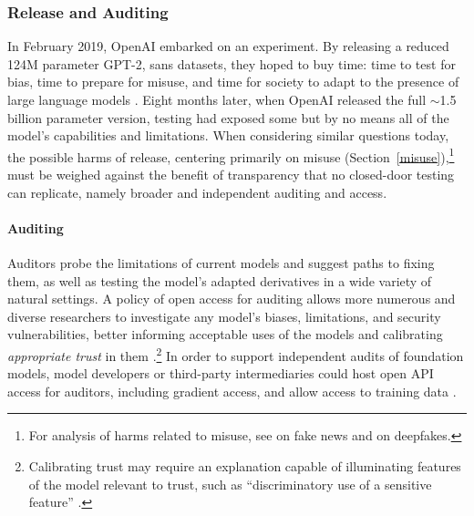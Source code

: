 \subsubsection{Release and Auditing}

In February 2019, OpenAI embarked on an experiment.  By releasing a reduced 124M parameter GPT-2, sans datasets, they hoped to buy time: time to test for bias, time to prepare for misuse, and time for society to adapt to the presence of large language models \citep{solaiman_release_2019}. Eight months later, when OpenAI released the full $\sim$1.5 billion parameter version, testing had exposed some but by no means all of the model’s capabilities and limitations. When considering similar questions today, the possible harms of release, centering primarily on misuse (Section~\ref{misuse}),\footnote{For analysis of harms related to misuse, see \citep{Rini2017-fakenews} on fake news and \citep{Rini2020deepfakes} on deepfakes.} must be weighed against the benefit of transparency that no closed-door testing can replicate, namely broader and independent auditing and access.  

\paragraph{Auditing}  
Auditors probe the limitations of current models and suggest paths to fixing them, as well as testing the model's adapted derivatives in a wide variety of natural settings. A policy of open access for auditing allows more numerous and diverse researchers to investigate any model’s biases, limitations, and security vulnerabilities, better informing acceptable uses of the models and calibrating \textit{appropriate trust} in them \citep{Danks2019, Baier1986}.\footnote{Calibrating trust may require an explanation capable of illuminating features of the model relevant to trust, such as ``discriminatory use of a sensitive feature'' \citep{dimanov2020you}.}  In order to support independent audits of foundation models, model developers or third-party intermediaries could host open API access for auditors, including gradient access, and allow access to training data \citep{raji2019, Raji2020}. 

